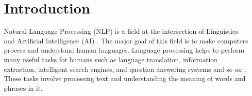 \documentclass[12pt]{report} %
\begin{document}


\pagestyle{plain}
\clearpage


\tableofcontents
\listoftables
\listoffigures
\newpage
{}





\chapter{Introduction}
\label{introduction}

	Natural Language Processing (NLP) is a field at the intersection of Linguistics and Artificial Intelligence (AI) \citep{jurafsky2014speech}. The major goal of this field is to make computers process and understand human languages. Language processing helps to perform many useful tasks for humans such as language translation, information extraction, intelligent search engines, and question answering systems and so on \citep{jurafsky2014speech}. These tasks involve processing text and understanding the meaning of words and phrases in it. 
	
\end{document}
